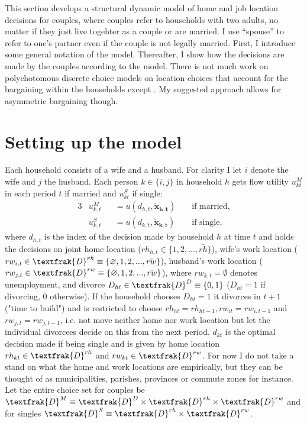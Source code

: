 This section develops a structural dynamic model of home and job location decisions for couples, where couples refer to households with two adults, no matter if they just live togehter as a couple or are married. I use ``spouse'' to refer to one's partner even if the couple is not legally married. First, I introduce some general notation of the model. Thereafter, I show how the decisions are made by the couples according to the model. There is not much work on polychotomous discrete choice models on location choices that account for the bargaining within the households except \cite{Gemici2011}. My suggested approach allows for asymmetric bargaining though.

\section{Setting up the model}\label{sec:setupmodel}
Each household consists of a wife and a husband. For clarity I let $i$ denote the wife and $j$ the husband. Each person $k\in\{i,j\}$ in household $h$ gets flow utility $u_{kt}^M$ in each period $t$ if married and $u_{kt}^S$ if single:
\begin{alignat}{3}
&u_{k,t}^M &&= u(d_{h,t},\boldsymbol{\tilde{x}_{h,t}}) &&\text{ if married}, \\
&u_{k,t}^S &&= u(d_{k,t},\boldsymbol{\tilde{x}_{k,t}}) &&\text{ if single},
\label{eq:u}
\end{alignat}
where $d_{h,t}$ is the index of the decision made by household $h$ at time $t$ and holds the decisions on joint home location ($rh_{h,t}\in \{1,2,...,\bar{rh}\}$), wife's work location ($rw_{i,t}\in \textfrak{D}^{rh}\equiv \{\emptyset,1,2,...,\bar{rw}\}$), husband's work location ($rw_{j,t}\in \textfrak{D}^{rw}\equiv \{\emptyset,1,2,...,\bar{rw}\}$), where $rw_{k,t}=\emptyset$ denotes unemployment, and divorce $D_{ht}\in\textfrak{D}^D\equiv\{0,1\}$ ($D_{ht}=1$ if divorcing, 0 otherwise). If the household chooses $D_{ht}=1$ it divorces in $t+1$ ("time to build") and is restricted to choose  $rh_{ht}=rh_{ht-1},rw_{it}=rw_{i,t-1}$ and $rw_{j,t}=rw_{j,t-1}$, i.e. not move neither home nor work location but let the individual divorcees decide on this from the next period. $d_{kt}$ is the optimal decision made if being single and is given by home location $rh_{kt}\in\textfrak{D}^{rh}$ and $rw_{kt}\in\textfrak{D}^{rw}$. For now I do not take a stand on what the home and work locations are empirically, but they can be thought of as municipalities, parishes, provinces or commute zones for instance. Let the entire choice set for couples be $\textfrak{D}^M\equiv \textfrak{D}^D\times\textfrak{D}^{rh}\times\textfrak{D}^{rw}$ and for singles $\textfrak{D}^S\equiv\textfrak{D}^{rh}\times\textfrak{D}^{rw}$.

